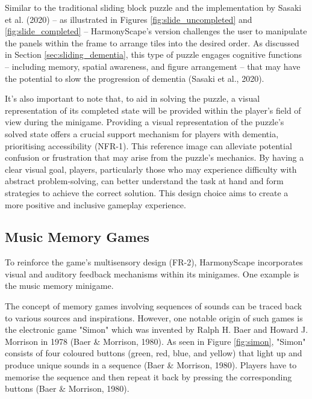 \documentclass{l4proj}
\begin{document}
Similar to the traditional sliding block puzzle and the implementation by Sasaki et al. (2020) – as illustrated in Figures \ref{fig:slide_uncompleted} and \ref{fig:slide_completed} – HarmonyScape's version challenges the user to manipulate the panels within the frame to arrange tiles into the desired order. As discussed in Section \ref{sec:sliding_dementia}, this type of puzzle engages cognitive functions – including memory, spatial awareness, and figure arrangement – that may have the potential to slow the progression of dementia (Sasaki et al., 2020).

It's also important to note that, to aid in solving the puzzle, a visual representation of its completed state will be provided within the player's field of view during the minigame. Providing a visual representation of the puzzle's solved state offers a crucial support mechanism for players with dementia, prioritising accessibility (NFR-1). This reference image can alleviate potential confusion or frustration that may arise from the puzzle's mechanics. By having a clear visual goal, players, particularly those who may experience difficulty with abstract problem-solving, can better understand the task at hand and form strategies to achieve the correct solution.  This design choice aims to create a more positive and inclusive gameplay experience.

\subsection{Music Memory Games}
To reinforce the game's multisensory design (FR-2), HarmonyScape incorporates visual and auditory feedback mechanisms within its minigames. One example is the music memory minigame. 

The concept of memory games involving sequences of sounds can be traced back to various sources and inspirations. However, one notable origin of such games is the electronic game "Simon" which was invented by Ralph H. Baer and Howard J. Morrison in 1978 (Baer \& Morrison, 1980). As seen in Figure \ref{fig:simon}, "Simon" consists of four coloured buttons (green, red, blue, and yellow) that light up and produce unique sounds in a sequence (Baer \& Morrison, 1980). Players have to memorise the sequence and then repeat it back by pressing the corresponding buttons (Baer \& Morrison, 1980).

\end{document}
